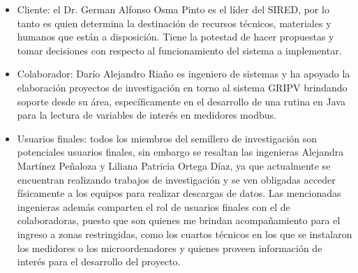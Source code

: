 \documentclass[
11pt, %
codirector, %
]{charter}
\begin{document}
 


\begin{itemize}
	\item Cliente: el Dr. German Alfonso Osma Pinto es el líder del SIRED, por lo tanto es quien determina la destinación de recursos técnicos, materiales y humanos que están a disposición. Tiene la potestad de hacer propuestas y tomar decisiones con respecto al funcionamiento del sistema a implementar.
	
	\item Colaborador: Darío Alejandro Riaño es ingeniero de sistemas y ha apoyado la elaboración proyectos de investigación en torno al sistema GRIPV brindando soporte desde su área, específicamente en el desarrollo de una rutina en Java para la lectura de variables de interés en medidores modbus.
	
	\item Usuarios finales: todos los miembros del semillero de investigación son potenciales usuarios finales, sin embargo se resaltan las ingenieras Alejandra Martínez Peñaloza y Liliana Patricia Ortega Díaz, ya que actualmente se encuentran realizando trabajos de investigación y se ven obligadas acceder físicamente a los equipos para realizar descargas de datos. Las  mencionadas ingenieras además comparten el rol de usuarios finales con el de colaboradoras, puesto que son quienes me brindan acompañamiento para el ingreso a zonas restringidas, como los cuartos técnicos en los que se instalaron los medidores o los microordenadores y quienes proveen información de interés para el desarrollo del proyecto.
	
\end{itemize}
\end{document}
